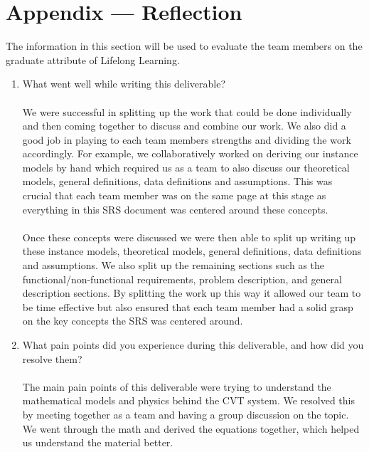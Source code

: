\documentclass[12pt]{article}
\begin{document}
\newpage





\newpage
\section*{Appendix --- Reflection}

The information in this section will be used to evaluate the team members on the
graduate attribute of Lifelong Learning.  



\begin{enumerate}
  \item What went well while writing this deliverable?
  \\\\
  We were successful in splitting up the work that could be done individually and then coming together to discuss and combine our work.
  We also did a good job in playing to each team members strengths and dividing the work accordingly. 
  For example, we collaboratively worked on deriving our instance models by hand which required us as a team to also discuss our theoretical models, general definitions, data definitions and assumptions. 
  This was crucial that each team member was on the same page at this stage as everything in this SRS document was centered around these concepts.
  \\\\
  Once these concepts were discussed we were then able to split up writing up these instance models, theoretical models, general definitions, data definitions and assumptions. 
  We also split up the remaining sections such as the functional/non-functional requirements, problem description, and general description sections. 
  By splitting the work up this way it allowed our team to be time effective but also ensured that each team member had a solid grasp on the key concepts the SRS was centered around.  
  \item What pain points did you experience during this deliverable, and how did
  you resolve them?
  \\\\
  The main pain points of this deliverable were trying to understand the mathematical models and physics behind the CVT system.
  We resolved this by meeting together as a team and having a group discussion on the topic.
  We went through the math and derived the equations together, which helped us understand the material better.

\end{enumerate}
\end{document}
